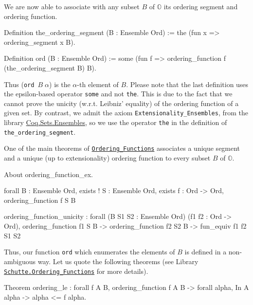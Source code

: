 {We are now able to associate with any subset $B$ of $\mathbb{O}$ its ordering segment and ordering function.

\begin{Coqsrc}
Definition the_ordering_segment (B : Ensemble Ord) :=
  the  (fun x => ordering_segment x B).

Definition ord  (B : Ensemble Ord) := 
  some (fun f => ordering_function f (the_ordering_segment B) B).
\end{Coqsrc}

Thus (\texttt{ord $B \;\alpha$}) is the $\alpha$-th element of $B$.
Please note that the last definition uses the epsilon-based operator \texttt{some} and
not \texttt{the}. This is due to the fact that we cannot prove the unicity (w.r.t. Leibniz' equality) of the ordering function of a given set. 
By contrast, we admit the axiom  \texttt{Extensionality\_Ensembles}, from the library 
\href{https://coq.inria.fr/distrib/current/stdlib/Coq.Sets.Ensembles.html}{Coq.Sets.Ensembles}, so we use the operator \texttt{the} in the definition of
\texttt{the\_ordering\_segment}.

One of the main theorems of
\href{../theories/html/hydras.Schutte.Ordering_Functions.html\#ordering_function_ex}%
{\texttt{Ordering\_Functions}} 
associates a unique segment and a unique (up to extensionality) ordering function to every subset $B$ of $\mathbb{O}$.

\begin{Coqsrc}
About ordering_function_ex.
\end{Coqsrc}

\begin{Coqanswer}
forall B : Ensemble Ord,
 exists ! S : Ensemble Ord, 
      exists f : Ord -> Ord, ordering_function f S B
\end{Coqanswer}


\begin{Coqanswer}
ordering_function_unicity :
forall (B S1 S2 : Ensemble Ord) (f1 f2 : Ord -> Ord),
ordering_function f1 S B ->
ordering_function f2 S2 B -> 
fun_equiv f1 f2 S1 S2
\end{Coqanswer}

Thus,  our function \texttt{ord}  which enumerates the elements of $B$ is defined in a non-ambiguous way.
Let us quote the following theorems (see Library
\href{../theories/html/hydras.Schutte.Ordering_Functions.html}%
{\texttt{Schutte.Ordering\_Functions}} for more details).
 

\begin{Coqsrc}
Theorem ordering_le : forall f A B,
    ordering_function f A B ->
    forall alpha, In A alpha -> alpha <= f alpha.


\end{Coqsrc}}
